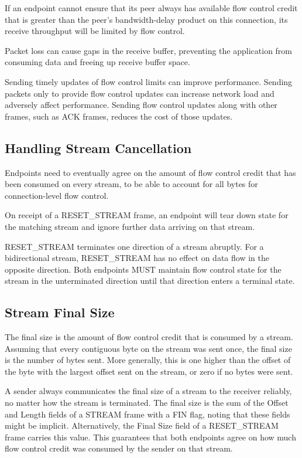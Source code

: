 \documentclass{article}
\begin{document}
If an endpoint cannot ensure that its peer always has available flow control credit that is greater than the peer's bandwidth-delay product on this connection, its receive throughput will be limited by flow control.

Packet loss can cause gaps in the receive buffer, preventing the application from consuming data and freeing up receive buffer space.

Sending timely updates of flow control limits can improve performance.  Sending packets only to provide flow control updates can increase network load and adversely affect performance.  Sending flow control updates along with other frames, such as ACK frames, reduces the cost of those updates.

\subsection{Handling Stream Cancellation}

Endpoints need to eventually agree on the amount of flow control credit that has been consumed on every stream, to be able to account for all bytes for connection-level flow control.

On receipt of a RESET\_STREAM frame, an endpoint will tear down state for the matching stream and ignore further data arriving on that stream.

RESET\_STREAM terminates one direction of a stream abruptly.  For a bidirectional stream, RESET\_STREAM has no effect on data flow in the opposite direction.  Both endpoints MUST maintain flow control state for the stream in the unterminated direction until that direction enters a terminal state.

\subsection{Stream Final Size}

The final size is the amount of flow control credit that is consumed by a stream.  Assuming that every contiguous byte on the stream was sent once, the final size is the number of bytes sent.  More generally, this is one higher than the offset of the byte with the largest offset sent on the stream, or zero if no bytes were sent.

A sender always communicates the final size of a stream to the receiver reliably, no matter how the stream is terminated.  The final size is the sum of the Offset and Length fields of a STREAM frame with a FIN flag, noting that these fields might be implicit. Alternatively, the Final Size field of a RESET\_STREAM frame carries this value.  This guarantees that both endpoints agree on how much flow control credit was consumed by the sender on that stream.
\end{document}
